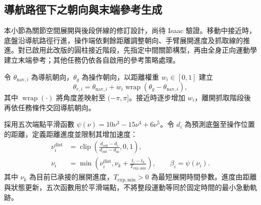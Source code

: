 
\subsection{導航路徑下之朝向與末端參考生成}
\label{subsec:navigation_manipulation_reference}

本小節為關節空間展開與後段併線的修訂設計，尚待 Isaac 驗證。移動中接近時，底盤沿導航路徑行進，操作端依剩餘距離調整朝向、手臂展開進度及抓取線的推進。對已啟用此改版的圓柱接近階段，先指定中間關節構型，再由全身正向運動學建立末端參考；其他任務仍依各自啟用的參考策略處理。

令 $\theta_{\mathrm{nav},i}$ 為導航朝向，$\theta_g$ 為操作朝向，以距離權重 $w_i\in[0,1]$ 建立
\begin{equation}
    \theta_{r,i}=\theta_{\mathrm{nav},i}
    +w_i\operatorname{wrap}(\theta_g-\theta_{\mathrm{nav},i}),
    \label{eq:ch3_operation_heading_reference}
\end{equation}
其中 $\operatorname{wrap}(\cdot)$ 將角度差映射至 $(-\pi,\pi]$。接近時逐步增加 $w_i$，離開抓取階段後再依任務條件交回導航朝向。

採用五次端點平滑函數 $\psi(\nu)=10\nu^3-15\nu^4+6\nu^5$\cite{flash1985coordination}。令 $d_i$ 為預測底盤至操作位置的距離，定義距離進度並限制其增加速度：
\begin{equation}
    \begin{aligned}
        \nu_i^{\mathrm{dist}}
        &=\operatorname{clip}\!\left(
          \frac{d_{\mathrm{out}}-d_i}{d_{\mathrm{out}}-d_{\mathrm{in}}},0,1\right),\\
        \nu_i&=\min\!\left(\nu_i^{\mathrm{dist}},
          \nu_k+\frac{t_i-t_k}{T_{\mathrm{exp,min}}}\right),
        \qquad \beta_i=\psi(\nu_i).
    \end{aligned}
    \label{eq:ch3_distance_based_arm_progress}
\end{equation}
其中 $\nu_k$ 為目前已承接的展開進度，$T_{\mathrm{exp,min}}>0$ 為最短展開時間參數。進度由距離與狀態更新，五次函數用於平滑端點，不將整段運動等同於固定時間的最小急動軌跡。

